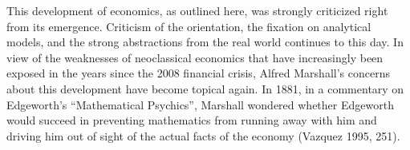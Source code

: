 \documentclass[
  british,
  a4paper,
  DIV=11,
  numbers=noendperiod,
  oneside,
  openany]{scrreprt}
\begin{document}
\begin{tcolorbox}
This development of economics, as outlined here, was strongly criticized
right from its emergence. Criticism of the orientation, the fixation on
analytical models, and the strong abstractions from the real world
continues to this day. In view of the weaknesses of neoclassical
economics that have increasingly been exposed in the years since the
2008 financial crisis, Alfred Marshall's concerns about this development
have become topical again. In 1881, in a commentary on Edgeworth's
``Mathematical Psychics'', Marshall wondered whether Edgeworth would
succeed in preventing mathematics from running away with him and driving
him out of sight of the actual facts of the economy (Vazquez 1995, 251).

\end{tcolorbox}

\end{document}
